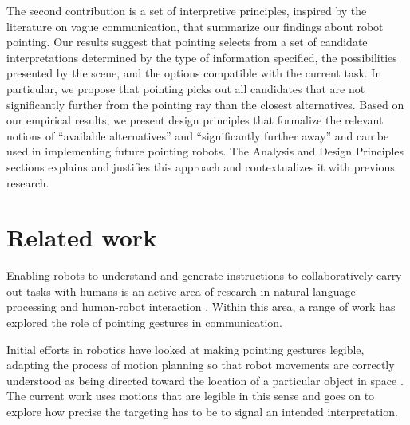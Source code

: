 \documentclass[letterpaper]{article} %
\begin{document}
The second contribution is a set of interpretive principles, inspired by the literature on vague communication, that summarize our findings about robot pointing.  Our results suggest that pointing selects from a set of candidate interpretations determined by the type of information specified, the possibilities presented by the scene, and the options compatible with the current task.  In particular, we propose that pointing picks out all candidates that are not significantly further from the pointing ray than the closest alternatives.  Based on our empirical results, we present design principles that formalize the relevant notions of ``available alternatives'' and ``significantly further away'' and can be used in implementing future pointing robots.  The Analysis and Design Principles sections explains and justifies this approach and contextualizes it with previous research.


\section{Related work}
\label{related-work}

Enabling robots to understand and generate instructions to collaboratively carry out tasks with humans is an active area of research in natural language processing and human-robot interaction \cite{butepage2017human,cha2018survey}.  Within this area, a range of work has explored the role of pointing gestures in communication.

Initial efforts in robotics have looked at making pointing gestures legible, adapting the process of motion planning so that robot movements are correctly understood as being directed toward the location of a particular object in space \cite{holladay2014legible,zhao2016experimental}.  The current work uses motions that are legible in this sense and goes on to explore how precise the targeting has to be to signal an intended interpretation.

\end{document}
